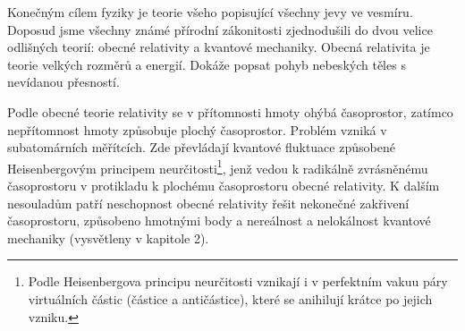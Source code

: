 Konečným cílem fyziky je teorie všeho popisující všechny jevy ve vesmíru. Doposud jsme všechny známé přírodní zákonitosti zjednodušili do dvou velice odlišných teorií: obecné relativity a kvantové mechaniky. Obecná relativita je teorie velkých rozměrů a energií. Dokáže popsat pohyb nebeských těles s nevídanou přesností.

Podle obecné teorie relativity se v přítomnosti hmoty ohýbá časoprostor, zatímco nepřítomnost hmoty způsobuje plochý časoprostor. Problém vzniká v subatomárních měřítcích. Zde převládají kvantové fluktuace způsobené Heisenbergovým principem neurčitosti\footnote[3]{Podle Heisenbergova principu neurčitosti vznikají i v perfektním vakuu páry virtuálních částic (částice a antičástice), které se anihilují krátce po jejich vzniku.}, jenž vedou k radikálně zvrásněnému časoprostoru v protikladu k plo\-chému časoprostoru obecné relativity. K dalším nesouladům patří neschopnost obecné relativity řešit nekonečné zakřivení časoprostoru, způsobeno hmotnými body a nereálnost a nelokálnost kvantové mechaniky (vysvětleny v kapitole 2).

